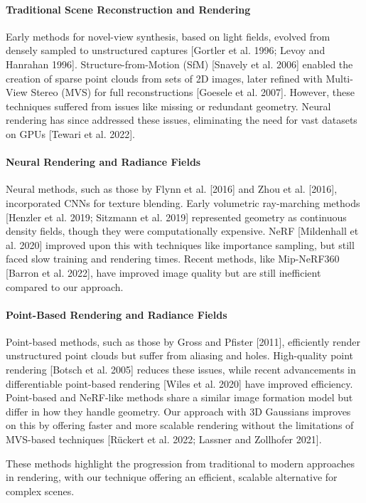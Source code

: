 \documentclass[11pt]{report}
\begin{document}
\paragraph{Traditional Scene Reconstruction and Rendering}
Early methods for novel-view synthesis, based on light fields, evolved from densely sampled to unstructured captures [Gortler et al. 1996; Levoy and Hanrahan 1996]. Structure-from-Motion (SfM) [Snavely et al. 2006] enabled the creation of sparse point clouds from sets of 2D images, later refined with Multi-View Stereo (MVS) for full reconstructions [Goesele et al. 2007]. However, these techniques suffered from issues like missing or redundant geometry. Neural rendering has since addressed these issues, eliminating the need for vast datasets on GPUs [Tewari et al. 2022].

\paragraph{Neural Rendering and Radiance Fields}
Neural methods, such as those by Flynn et al. [2016] and Zhou et al. [2016], incorporated CNNs for texture blending. Early volumetric ray-marching methods [Henzler et al. 2019; Sitzmann et al. 2019] represented geometry as continuous density fields, though they were computationally expensive. NeRF [Mildenhall et al. 2020] improved upon this with techniques like importance sampling, but still faced slow training and rendering times. Recent methods, like Mip-NeRF360 [Barron et al. 2022], have improved image quality but are still inefficient compared to our approach.

\paragraph{Point-Based Rendering and Radiance Fields}
Point-based methods, such as those by Gross and Pfister [2011], efficiently render unstructured point clouds but suffer from aliasing and holes. High-quality point rendering [Botsch et al. 2005] reduces these issues, while recent advancements in differentiable point-based rendering [Wiles et al. 2020] have improved efficiency. Point-based and NeRF-like methods share a similar image formation model but differ in how they handle geometry. Our approach with 3D Gaussians improves on this by offering faster and more scalable rendering without the limitations of MVS-based techniques [R\"{u}ckert et al. 2022; Lassner and Zollhofer 2021].

These methods highlight the progression from traditional to modern approaches in rendering, with our technique offering an efficient, scalable alternative for complex scenes.
\end{document}
